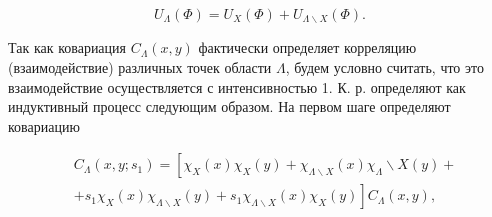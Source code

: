 \documentclass[10pt]{article}
\begin{document}
\[

U_{\Lambda}(\Phi)=U_{X}(\Phi)+U_{\Lambda \backslash X}(\Phi) .

\]



Так как ковариация $C_{\Lambda}(x, y)$ фактически определяет корреляцию (взаимодействие) различных точек области $\Lambda$, будем условно считать, что это взаимодействие осуществляется с интенсивностью 1. К. р. определяют как индуктивный процесс следующим образом. На первом шаге определяют ковариацию



\[

\begin{aligned}

& C_{\Lambda}\left(x, y ; s_{1}\right)=\left[\chi_{X}(x) \chi_{X}(y)+\chi_{\Lambda \backslash X}(x) \chi_{\Lambda} \backslash X(y)+\right. \\

& \left.+s_{1} \chi_{X}(x) \chi_{\Lambda \backslash X}(y)+s_{1} \chi_{\Lambda \backslash X}(x) \chi_{X}(y)\right] C_{\Lambda}(x, y),

\end{aligned}

\]
\end{document}
